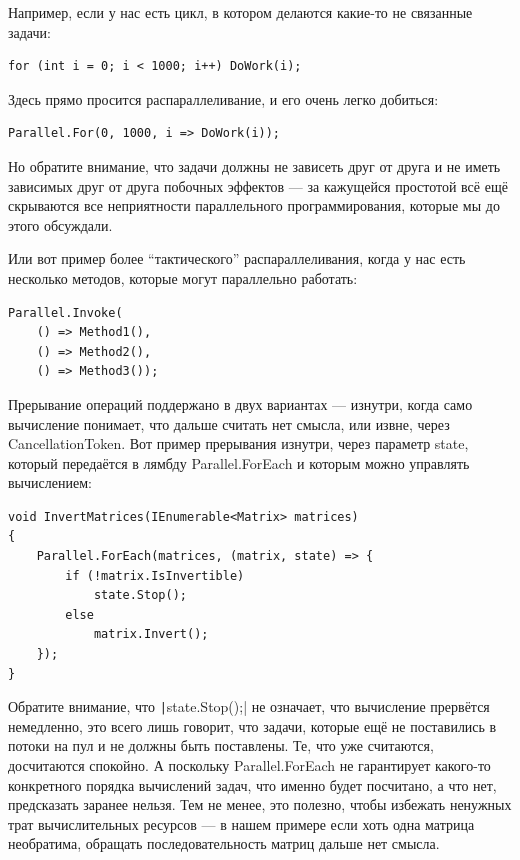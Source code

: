 \documentclass[a5paper]{article}
\begin{document}
Например, если у нас есть цикл, в котором делаются какие-то не связанные задачи:

\begin{verbatim}
for (int i = 0; i < 1000; i++) DoWork(i);
\end{verbatim}

Здесь прямо просится распараллеливание, и его очень легко добиться:

\begin{verbatim}
Parallel.For(0, 1000, i => DoWork(i));
\end{verbatim}

Но обратите внимание, что задачи должны не зависеть друг от друга и не иметь зависимых друг от друга побочных эффектов --- за кажущейся простотой всё ещё скрываются все неприятности параллельного программирования, которые мы до этого обсуждали.

Или вот пример более ``тактического'' распараллеливания, когда у нас есть несколько методов, которые могут параллельно работать:

\begin{verbatim}
Parallel.Invoke(
    () => Method1(),
    () => Method2(),
    () => Method3());
\end{verbatim}

Прерывание операций поддержано в двух вариантах --- изнутри, когда само вычисление понимает, что дальше считать нет смысла, или извне, через CancellationToken. Вот пример прерывания изнутри, через параметр state, который передаётся в лямбду Parallel.ForEach и которым можно управлять вычислением:

\begin{verbatim}
void InvertMatrices(IEnumerable<Matrix> matrices)
{
    Parallel.ForEach(matrices, (matrix, state) => {
        if (!matrix.IsInvertible)
            state.Stop();
        else
            matrix.Invert();
    });
}
\end{verbatim}

Обратите внимание, что \texttt|state.Stop();| не означает, что вычисление прервётся немедленно, это всего лишь говорит, что задачи, которые ещё не поставились в потоки на пул и не должны быть поставлены. Те, что уже считаются, досчитаются спокойно. А поскольку Parallel.ForEach не гарантирует какого-то конкретного порядка вычислений задач, что именно будет посчитано, а что нет, предсказать заранее нельзя. Тем не менее, это полезно, чтобы избежать ненужных трат вычислительных ресурсов --- в нашем примере если хоть одна матрица необратима, обращать последовательность матриц дальше нет смысла.
\end{document}
